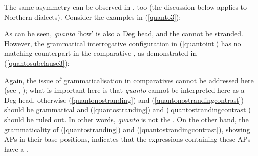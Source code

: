 The same asymmetry can be observed in , too (the discussion below applies to Northern dialects). Consider the examples in (\ref{quanto3}):

\ea \label{quanto3}
\z
\z

As can be seen, \textit{quanto} `how' is also a Deg head, and the  cannot be stranded. However, the grammatical interrogative configuration in (\ref{quantoint}) has no matching counterpart in the comparative , as demonstrated in (\ref{quantosubclause3}):

\ea \label{quantosubclause3}
\z
\z

Again, the issue of grammaticalisation in  comparatives cannot be addressed here (see \citealt[226--228]{bacskaiatkari2014dia}, \citealt{bacskaiatkari2014diss}); what is important here is that \textit{quanto} cannot be interpreted here as a Deg head, otherwise (\ref{quantonostranding}) and (\ref{quantonostrandingcontrast}) should be grammatical and (\ref{quantostranding}) and (\ref{quantostrandingcontrast}) should be ruled out. In other words, \textit{quanto} is not the . On the other hand, the grammaticality of (\ref{quantostranding}) and (\ref{quantostrandingcontrast}), showing APs in their base positions, indicates that the  expressions containing these APs have a   .

